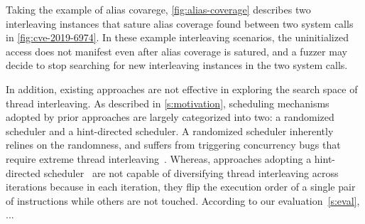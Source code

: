 Taking the example of alias covarege, \autoref{fig:alias-coverage}
describes two interleaving instances that sature alias coverage found
between two system calls in \autoref{fig:cve-2019-6974}.
%
In these example interleaving scenarios, the uninitialized access does
not manifest even after alias coverage is satured, and a fuzzer may
decide to stop searching for new interleaving instances in the two
system calls.


%
%
In addition, existing approaches are not effective in exploring the
search space of thread interleaving.
%
As described in \autoref{s:motivation}, scheduling mechanisms adopted
by prior approaches are largely categorized into two: a randomized
scheduler and a hint-directed scheduler.
%
A randomized scheduler inherently relines on the randomness, and
suffers from triggering concurrency bugs that require extreme thread
interleaving~\cite{cve20196974, cve20191999, cve201911486}.
%
Whereas, approaches adopting a hint-directed scheduler~\cite{razzer,
  snowboard} are not capable of diversifying thread interleaving
across iterations because in each iteration, they flip the execution
order of a single pair of instructions while others are not touched.
%
According to our evaluation~\autoref{s:eval}, ...









